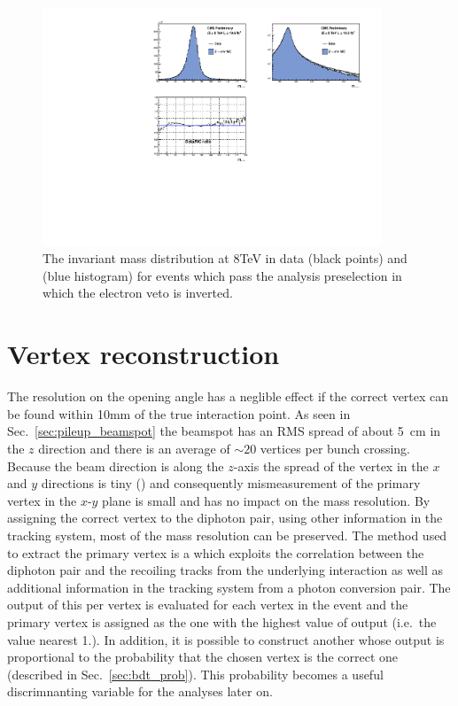 \begin{figure}
  \includegraphics[width=0.9\textwidth]{analysis_comps/plots/smearing_mass_Zee_8TeV.pdf}
  \caption{The \Zee invariant mass distribution at 8TeV in data (black points) and \MC (blue histogram) for events which pass the analysis preselection in which the electron veto is inverted.}
  \label{fig:scale_smearing_analysis_8TeV}
\end{figure}

\section{Vertex reconstruction}
\label{sec:vtx_reco}

The resolution on the opening angle has a neglible effect if the correct vertex can be found within 10mm of the true interaction point. As seen in Sec.~\ref{sec:pileup_beamspot} the beamspot has an RMS spread of about 5~cm in the $z$ direction and there is an average of $\sim20$ vertices per bunch crossing. Because the beam direction is along the $z$-axis the spread of the vertex in the $x$ and $y$ directions is tiny () and consequently mismeasurement of the primary vertex in the $x$-$y$ plane is small and has no impact on the mass resolution. By assigning the correct vertex to the diphoton pair, using other information in the tracking system, most of the mass resolution can be preserved. The method used to extract the primary vertex is a \BDT which exploits the correlation between the diphoton pair and the recoiling tracks from the underlying interaction as well as additional information in the tracking system from a photon conversion pair. The output of this per vertex \BDT is evaluated for each vertex in the event and the primary vertex is assigned as the one with the highest value of \BDT output (i.e.\ the value nearest 1.). In addition, it is possible to construct another \BDT whose output is proportional to the probability that the chosen vertex is the correct one (described in Sec.~\ref{sec:bdt_prob}). This probability becomes a useful discrimnanting variable for the analyses later on.

